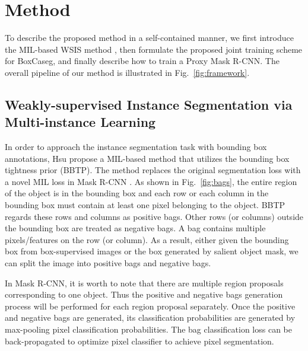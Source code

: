 \documentclass[final]{cvpr}
\begin{document}
\vspace{-1mm}
\section{Method}
\vspace{-1mm}





To describe the proposed method in a self-contained manner, we first introduce the MIL-based WSIS method \cite{hsu2019weakly}, then formulate the proposed joint training scheme for BoxCaseg, and finally describe how to train a Proxy Mask R-CNN. The overall pipeline of our method is illustrated in Fig.~\ref{fig:framework}.

\subsection{Weakly-supervised Instance Segmentation via Multi-instance Learning}
\label{sec:bbtp}



In order to approach the instance segmentation task with bounding box annotations, Hsu \etal \cite{hsu2019weakly} propose a MIL-based method that utilizes the bounding box tightness prior (BBTP). The method replaces the original segmentation loss with a novel MIL loss in Mask R-CNN \cite{he2017mask}. 
As shown in Fig.~\ref{fig:bags}, the entire region of the object is in the bounding box and each row or each column in the bounding box must contain at least one pixel belonging to the object. BBTP regards these rows and columns as positive bags. Other rows (or columns) outside the bounding box are treated as negative bags. A bag contains multiple pixels/features on the row (or column). As a result, either given the bounding box from box-supervised images or the box generated by salient object mask, we can split the image into positive bags and negative bags. 

In Mask R-CNN, it is worth to note that there are multiple region proposals corresponding to one object. Thus the positive and negative bags generation process will be performed for each region proposal separately. Once the positive and negative bags are generated, its classification probabilities are generated by max-pooling pixel classification probabilities. The bag classification loss can be back-propagated to optimize pixel classifier to achieve pixel segmentation.
\end{document}
